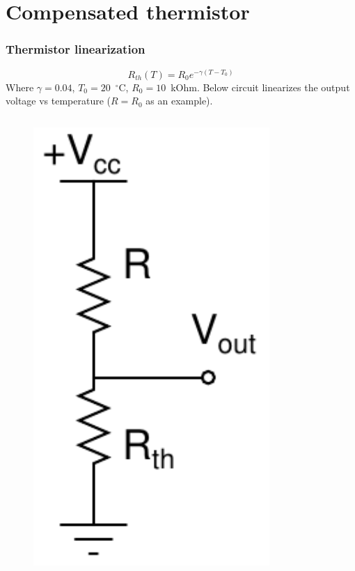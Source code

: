 \documentclass[beamer]{standalone}
\begin{document}
\section{Compensated thermistor}
\frame
{ \frametitle{Thermistor linearization}
\[
R_{th}(T)=R_0 e^{-\gamma (T-T_0)}
\]
Where $\gamma=0.04$, $T_0=20$~$^\circ$C, $R_0=10$~kOhm.
Below circuit linearizes the output 
voltage vs temperature ($R=R_0$ as an example).
\begin{columns}[c]
	\begin{column}{.25\textwidth}
		\begin{figure}
			\includegraphics[width=0.80\textwidth]{./schematics/thermistor_linearization.pdf}
		\end{figure}
		

\end{column}
\end{columns}}
\end{document}
